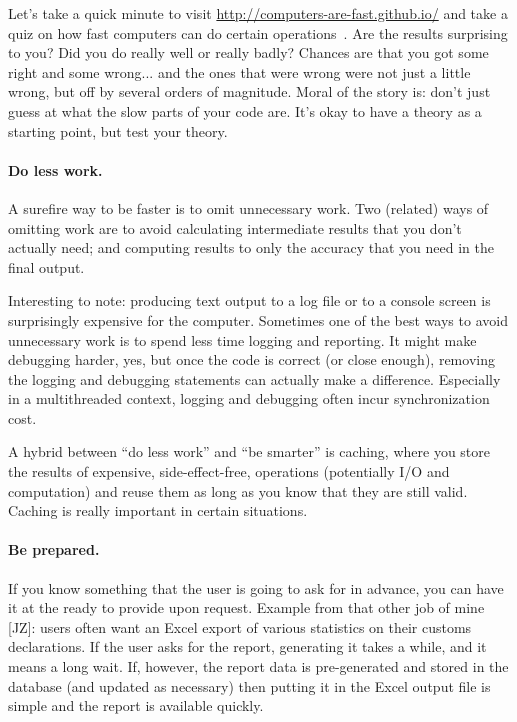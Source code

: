 Let's take a quick minute to visit \url{http://computers-are-fast.github.io/} and take a quiz on how fast computers can do certain operations~\cite{cafgithub}. Are the results surprising to you? Did you do really well or really badly? Chances are that you got some right and some wrong... and the ones that were wrong were not just a little wrong, but off by several orders of magnitude. Moral of the story is: don't just guess at what the slow parts of your code are. It's okay to have a theory as a starting point, but test your theory.


\paragraph{Do less work.} A surefire way to be faster is to omit unnecessary
work. Two (related) ways of omitting work are to avoid calculating
intermediate results that you don't actually need; and computing
results to only the accuracy that you need in the final output.

Interesting to note: producing text output to a log file or to a console screen is surprisingly expensive for the computer. Sometimes one of the best ways to avoid unnecessary work is to spend less time logging and reporting. It might make debugging harder, yes, but once the code is correct (or close enough), removing the logging and debugging statements can actually make a difference. Especially in a multithreaded context, logging and debugging often incur synchronization cost.

A hybrid between ``do less work'' and ``be smarter'' is caching, where
you store the results of expensive, side-effect-free, operations
(potentially I/O and computation) and reuse them as long as you
know that they are still valid. Caching is really important in certain situations.

\paragraph{Be prepared.} If you know something that the user is going to ask for in advance, you can have it at the ready to provide upon request. Example from that other job of mine [JZ]: users often want an Excel export of various statistics on their customs declarations. If the user asks for the report, generating it takes a while, and it means a long wait. If, however, the report data is pre-generated and stored in the database (and updated as necessary) then putting it in the Excel output file is simple and the report is available quickly.

